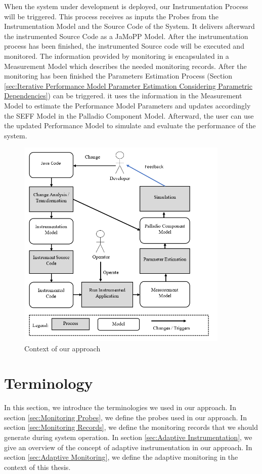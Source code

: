 When the system under development is deployed, our Instrumentation Process will be triggered. This process receives as inputs the Probes from the Instrumentation Model and the Source Code of the System. It delivers afterward the instrumented Source Code as a JaMoPP Model. After the instrumentation process has been finished, the instrumented Source code will be executed and monitored.  The information provided by monitoring is encapsulated in a Measurement Model which describes the needed monitoring records.  After the monitoring has been finished the Parameters Estimation Process (Section \ref{sec:Iterative Performance Model Parameter Estimation Considering Parametric Dependencies}) can be triggered. it uses the information in the Measurement Model to estimate the Performance Model Parameters and updates accordingly the SEFF Model in the Palladio Component Model. Afterward, the user can use the updated Performance Model to simulate and evaluate the performance of the system. 


\begin{figure}[h]
\centering
\includegraphics[width=0.9\textwidth]{figures/approach_context}
\caption{Context of our approach}
\label{fig:Context of our approach}
\end{figure}

\section{Terminology}
\label{sec:Terminology}
In this section, we introduce the terminologies we used in our approach. In section \ref{sec:Monitoring Probes}, we define the probes used in our approach. In section \ref{sec:Monitoring Records}, we define the monitoring records that we should generate during system operation. In section \ref{sec:Adaptive Instrumentation}, we give an overview of the concept of adaptive instrumentation in our approach. In section \ref{sec:Adaptive Monitoring}, we define the adaptive monitoring in the context of this thesis.

